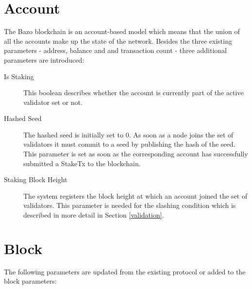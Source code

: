 \section{Account}
The Bazo blockchain is an account-based model which means that the union of all the accounts make up the state of the network. Besides the three existing parameters - address, balance and and transaction count - three additional parameters are introduced:

\begin{description}
	\item[Is Staking] This boolean describes whether the account is currently part of the active validator set or not.
	\item[Hashed Seed] The hashed seed is initially set to 0. As soon as a node joins the set of validators it must commit to a seed by publishing the hash of the seed. This parameter is set as soon as the corresponding account has successfully submitted a StakeTx to the blockchain.
	\item[Staking Block Height] The system registers the block height at which an account joined the set of validators. This parameter is needed for the slashing condition which is described in more detail in Section \ref{validation}.
\end{description}

\section{Block}
The following parameters are updated from the existing protocol or added to the block parameters:

